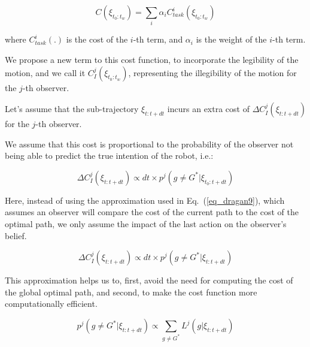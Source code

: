 \begin{equation}
    \label{eq:cost_general}
    C(\xi_{t_0:t_w}) = \sum_i \alpha_i C_{task}^i(\xi_{t_0:t_w})
\end{equation}

\noindent
where $C_{task}^i(.)$ is the cost of the $i$-th term, and $\alpha_i$ is the weight of the $i$-th term.

We propose a new term to this cost function, to incorporate the legibility of the motion,
and we call it $C_{I}^j(\xi_{t_0:t_w})$, representing the illegibility of the motion for the $j$-th observer.


Let's assume that the sub-trajectory $\xi_{t:t+dt}$ incurs an extra cost of $\Delta C_{I}^j(\xi_{t:t+dt})$ for the $j$-th observer.

We assume that this cost is proportional to the probability of the observer not being able to predict the true intention of the robot, i.e.:

\begin{equation}
    \label{eq:cost_leg}
    \Delta C_{I}^j(\xi_{t:t+dt}) \propto dt \times  p^j(g \neq G^* | \xi_{t_0:t+dt})
\end{equation}

\noindent
Here, instead of using the approximation used in Eq.~(\ref{eq_dragan9}),
which assumes an observer will compare the cost of the current path to the cost of the optimal path,
we only assume the impact of the last action on the observer's belief.

\begin{equation}
    \label{eq:cost_leg_approx}
    \Delta C_{I}^j(\xi_{t:t+dt}) \propto dt \times  p^j(g \neq G^* | \xi_{t:t+dt})
\end{equation}

This approximation helps us to, first, avoid the need for computing the cost of the global optimal path,
and second, to make the cost function more computationally efficient.

\noindent

\begin{equation}
    \label{eq:prob_leg}
    p^j(g \neq G^* | \xi_{t:t+dt}) \propto \sum_{g \neq G^*} L^j(g | \xi_{t:t+dt})
\end{equation}

